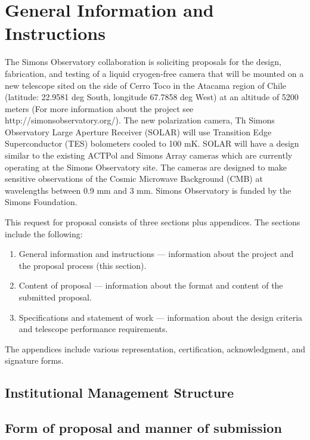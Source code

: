 \documentclass[12pt,letter]{article}
\begin{document}


\tableofcontents
\clearpage

\section{General Information and Instructions}
The Simons Observatory collaboration is soliciting proposals for the design, fabrication, and testing of a liquid cryogen-free camera that will be mounted on a new telescope sited on the side of Cerro Toco in the Atacama region of Chile (latitude: 22.9581 deg South, longitude 67.7858 deg West) at an altitude of 5200 meters (For more information about the project see http://simonsobservatory.org/). The new polarization camera, Th Simons Observatory Large Aperture Receiver (SOLAR) will use Transition Edge Superconductor (TES) bolometers cooled to 100 mK. SOLAR will have a design similar to the existing ACTPol and Simons Array cameras which are currently operating at the Simons Observatory site. The cameras are designed to make sensitive observations of the Cosmic Microwave Background (CMB) at wavelengths between 0.9 mm and 3 mm. Simons Observatory is funded by the Simons Foundation.

This request for proposal consists of three sections plus appendices. The sections include the following:
\begin{enumerate}
\item General information and instructions — information about the project and the proposal process (this section).
\item Content of proposal — information about the format and content of the submitted proposal.
\item Specifications and statement of work — information about the design criteria and telescope performance requirements.
\end{enumerate}

The appendices include various representation, certification, acknowledgment, and signature forms.

\subsection{Institutional Management Structure}

\subsection{Form of proposal and manner of submission}
\end{document}
